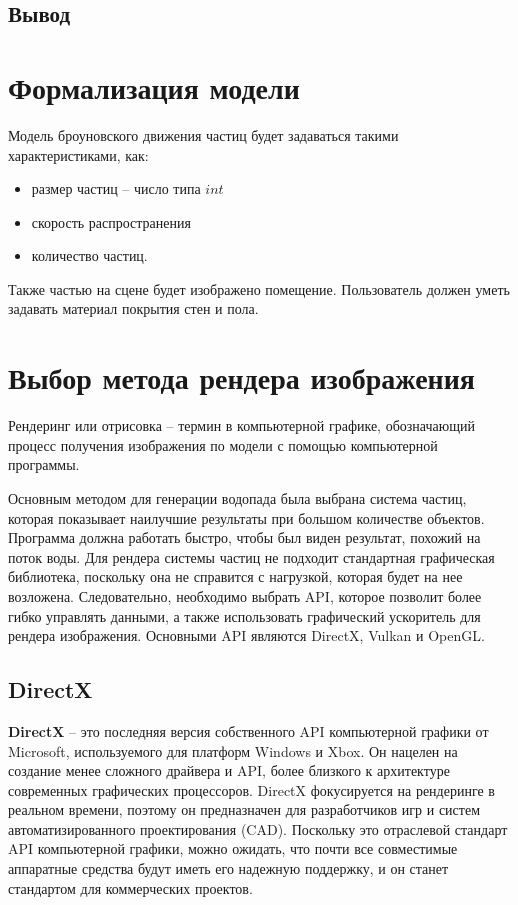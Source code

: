 \subsection*{Вывод}

\newpage

\section{Формализация модели}
Модель броуновского движения частиц будет задаваться такими характеристиками, как:
\begin{itemize} 
    \item размер частиц -- число типа $int$
    \item скорость распространения
    \item количество частиц.
\end{itemize}

Также частью на сцене будет изображено помещение. Пользователь должен уметь задавать материал покрытия стен и пола.


\section{Выбор метода рендера изображения}

Рендеринг или отрисовка -- термин в компьютерной графике, обозначающий процесс получения изображения по модели с помощью компьютерной программы.

Основным методом для генерации водопада была выбрана система частиц, которая показывает наилучшие результаты при большом количестве объектов. Программа должна работать быстро, чтобы был виден результат, похожий на поток воды. Для рендера системы частиц не подходит стандартная графическая библиотека, поскольку она не справится с нагрузкой, которая будет на нее возложена. Следовательно, необходимо выбрать API, которое позволит более гибко управлять данными, а также использовать графический ускоритель для рендера изображения. Основными API являются DirectX, Vulkan и OpenGL.

\subsection{DirectX}

\textbf{DirectX} -- это последняя версия собственного API компьютерной графики от Microsoft, используемого для платформ Windows и Xbox. Он нацелен на создание менее сложного драйвера и API, более близкого к архитектуре современных графических процессоров. DirectX фокусируется на рендеринге в реальном времени, поэтому он предназначен для разработчиков игр и систем автоматизированного проектирования (CAD). Поскольку это отраслевой стандарт API компьютерной графики, можно ожидать, что почти все совместимые аппаратные средства будут иметь его надежную поддержку, и он станет стандартом для коммерческих проектов.

